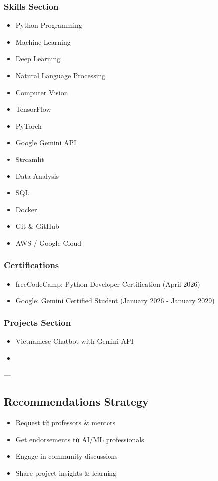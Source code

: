 \documentclass[12pt,a4paper]{article}
\begin{document}
\subsubsection{Skills Section}
\begin{itemize}
    \item Python Programming
    \item Machine Learning
    \item Deep Learning
    \item Natural Language Processing
    \item Computer Vision
    \item TensorFlow
    \item PyTorch
    \item Google Gemini API
    \item Streamlit
    \item Data Analysis
    \item SQL
    \item Docker
    \item Git \& GitHub
    \item AWS / Google Cloud
\end{itemize}

\subsubsection{Certifications}
\begin{itemize}
    \item freeCodeCamp: Python Developer Certification (April 2026)
    \item Google: Gemini Certified Student (January 2026 - January 2029)
\end{itemize}

\subsubsection{Projects Section}
\begin{itemize}
    \item Vietnamese Chatbot with Gemini API
    \item [Other projects to be added]
\end{itemize}

---

\subsection{Recommendations Strategy}

\begin{itemize}
    \item Request từ professors \& mentors
    \item Get endorsements từ AI/ML professionals
    \item Engage in community discussions
    \item Share project insights \& learning
\end{itemize}
\end{document}
